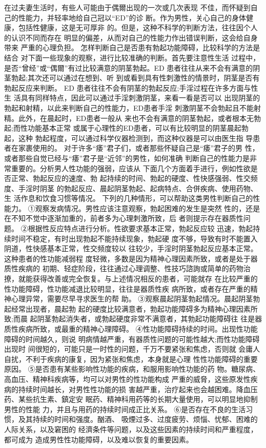 \documentclass[12pt,UTF8]{ctexbook}
\begin{document}
在过夫妻生活时，有些人可能由于偶爾出现的一次或几次表现
不佳，而怀疑到自己的性能力，并轻率地给自己冠以“ED”的诊
断。作为男性，关心自己的身体健康，包括性健康，这是无可厚非
的。但是，这种不科学的判断方法，往往因个人的认识不同而存在
明显的偏差，从而对自己的性能力作出错误判断，这会给自身带来
严重的心理负担。
怎样判断自己是否患有勃起功能障碍，比较科学的方法是结合
对下面一些现象的观察，进行比较准确的判断。首先要注意性生活
过程中，是否“曾经”或“偶爾”有过比较满意的阴茎勃起。ED
患者往往从来不会有满意的阴茎勃起;其次还可以通过在想到、听
到或看到具有性刺激性的情景时，阴茎是否有勃起反应来判断。
ED 患者往往不会有阴茎的勃起反应;手淫过程在许多方面与性生
活具有同样特点，因此可以通过手淫刺激阴茎，来看一看是否可以
出现阴茎的勃起和射精，以此来判断自己的性能力，ED患者手淫
刺激阴茎不会勃起且不能射精。此外，在晨起时，ED患者一般从
来也不会有满意的阴茎勃起，或者根本无勃起;而性功能基本正常
或属于心理性的ED患者，可以有比较明显的阴茎晨起勃起，这种
勃起程度，可以通过科学仪器检测到，而这种仪器是可以由医生指
导患者在家裹使用的。
对于许多“痿”君子们，或者那些怀疑自己是“痿”君子的男
性，或者那些自觉已经与“痿”君子是“近邻”的男性，如何准确
判断自己的性能力是非常重要的。分析男人性功能的强弱，应该从
下面几个方面着手进行，例如性欲是否正常、勃起反应的速度、勃
起持续的时间、勃起的硬度、性快感强弱、性交频度、手淫时阴茎
的勃起反应、晨起阴茎勃起、起病特点、合併疾病、使用药物、生
活作息和饮食习惯等情况。
下列的几种情形，可以帮助这类男性判断自己的性能力。
①观察发病情况。男性应该注意观察，勃起困难的发生是突然
性的，还是在不知不觉中逐渐加重的，前者多为心理刺激所致，后
者则提示存在器质性问题。
②根据性反应特点进行分析。性欲要求基本正常，勃起反应较
迅速，勃起持续时间不稳定，有时出现勃起不能持续现象，勃起硬
度不够，导致有时不能置入阴道，性快感基本正常，性交频度较以
往较少，手淫时阴茎勃起反应基本正常。这种患者的性功能减弱程
度轻微，多数是因为精神心理因素所致，或者是处于器质性疾病的
初期、轻症阶段，往往通过心理调整、性技巧諮詢或简单的药物治
撩，就能获得改善或完全恢复。与上述情况相反的患者，可能就存
在比较严重的性功能障碍，性功能减退比较明显，往往是器质性疾
病所致，或者存在严重的精神心理异常，需要尽早寻求医生的帮
助。
③观察晨起阴茎勃起情况。晨起阴茎勃起经常出现者，晨起勃
起的硬度比较满意者，勃起功能障碍多为精神心理因素所致;而晨
起阴茎勃起消失者，或勃起硬度非常不满意者，其勃起功能障碍往
往是器质性疾病所致，或最重的精神心理障碍。
④性功能障碍持续的时间。出现性功能障碍的时间越久，则说
明病情越严重，有器质性问题的可能性越大;而性功能障碍出现时
间很短的，可能只是一时性的问题，千万不要紧张和焦虑，否则就
会庸人自扰，不利于疾病的康复，因为紧张和焦虑，本身就是心理
性性功能障碍的重要原因。
⑤是否患有某些影响性功能的疾病，和服用影响性功能的药
物。糖尿病、高血压、精神科疾病等，均可以对男性的性功能构成
严重的威脅，这些原发性疾病的持续时间越长，对男性性功能的损
害越严重，治疗起来也会越困难。降血压药、某些抗生素、鎮定安
眠药、精神科用药等的长期大量使用，可以明显地抑制男性的性能
力，并且与用药的持续时间成正比关系。
⑥是否存在不良的生活习惯，及其持续的时间和强度。酗酒、
吸煙过多、过度疲劳、烦惱、忧郁、困难的人际关系，以及窘困的
经濟条件等问题，以及这些因素的持续时间和严重程度，都可成为
造成男性性功能障碍，以及难以恢复的重要因素。
\end{document}
